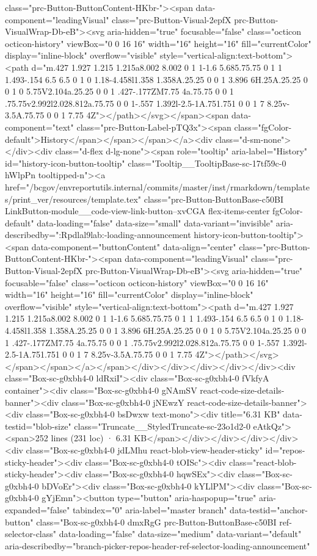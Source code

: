 {{{{{{{{{{{{{{{{{{{{{{{{{{{{{{{class="prc-Button-ButtonContent-HKbr-"><span data-component="leadingVisual" class="prc-Button-Visual-2epfX prc-Button-VisualWrap-Db-eB"><svg aria-hidden="true" focusable="false" class="octicon octicon-history" viewBox="0 0 16 16" width="16" height="16" fill="currentColor" display="inline-block" overflow="visible" style="vertical-align:text-bottom"><path d="m.427 1.927 1.215 1.215a8.002 8.002 0 1 1-1.6 5.685.75.75 0 1 1 1.493-.154 6.5 6.5 0 1 0 1.18-4.458l1.358 1.358A.25.25 0 0 1 3.896 6H.25A.25.25 0 0 1 0 5.75V2.104a.25.25 0 0 1 .427-.177ZM7.75 4a.75.75 0 0 1 .75.75v2.992l2.028.812a.75.75 0 0 1-.557 1.392l-2.5-1A.751.751 0 0 1 7 8.25v-3.5A.75.75 0 0 1 7.75 4Z"></path></svg></span><span data-component="text" class="prc-Button-Label-pTQ3x"><span class="fgColor-default">History</span></span></span></a><div class="d-sm-none"></div><div class="d-flex d-lg-none"><span role="tooltip" aria-label="History" id="history-icon-button-tooltip" class="Tooltip__TooltipBase-sc-17tf59c-0 hWlpPn tooltipped-n"><a href="/bcgov/envreportutils.internal/commits/master/inst/rmarkdown/templates/print_ver/resources/template.tex" class="prc-Button-ButtonBase-c50BI LinkButton-module__code-view-link-button--xvCGA flex-items-center fgColor-default" data-loading="false" data-size="small" data-variant="invisible" aria-describedby=":Rpdlal9lab:-loading-announcement history-icon-button-tooltip"><span data-component="buttonContent" data-align="center" class="prc-Button-ButtonContent-HKbr-"><span data-component="leadingVisual" class="prc-Button-Visual-2epfX prc-Button-VisualWrap-Db-eB"><svg aria-hidden="true" focusable="false" class="octicon octicon-history" viewBox="0 0 16 16" width="16" height="16" fill="currentColor" display="inline-block" overflow="visible" style="vertical-align:text-bottom"><path d="m.427 1.927 1.215 1.215a8.002 8.002 0 1 1-1.6 5.685.75.75 0 1 1 1.493-.154 6.5 6.5 0 1 0 1.18-4.458l1.358 1.358A.25.25 0 0 1 3.896 6H.25A.25.25 0 0 1 0 5.75V2.104a.25.25 0 0 1 .427-.177ZM7.75 4a.75.75 0 0 1 .75.75v2.992l2.028.812a.75.75 0 0 1-.557 1.392l-2.5-1A.751.751 0 0 1 7 8.25v-3.5A.75.75 0 0 1 7.75 4Z"></path></svg></span></span></a></span></div></div></div></div></div><div class="Box-sc-g0xbh4-0 ldRxiI"><div class="Box-sc-g0xbh4-0 fVkfyA container"><div class="Box-sc-g0xbh4-0 gNAmSV react-code-size-details-banner"><div class="Box-sc-g0xbh4-0 jNEwzY react-code-size-details-banner"><div class="Box-sc-g0xbh4-0 bsDwxw text-mono"><div title="6.31 KB" data-testid="blob-size" class="Truncate__StyledTruncate-sc-23o1d2-0 eAtkQz"><span>252 lines (231 loc) · 6.31 KB</span></div></div></div></div><div class="Box-sc-g0xbh4-0 jdLMhu react-blob-view-header-sticky" id="repos-sticky-header"><div class="Box-sc-g0xbh4-0 tOISc"><div class="react-blob-sticky-header"><div class="Box-sc-g0xbh4-0 hqwSEx"><div class="Box-sc-g0xbh4-0 bDVoEr"><div class="Box-sc-g0xbh4-0 kYLlPM"><div class="Box-sc-g0xbh4-0 gYjEmn"><button type="button" aria-haspopup="true" aria-expanded="false" tabindex="0" aria-label="master branch" data-testid="anchor-button" class="Box-sc-g0xbh4-0 dmxRgG prc-Button-ButtonBase-c50BI ref-selector-class" data-loading="false" data-size="medium" data-variant="default" aria-describedby="branch-picker-repos-header-ref-selector-loading-announcement" }}}}}}}}}}}}}}}}}}}}}}}}}}}}}}}
